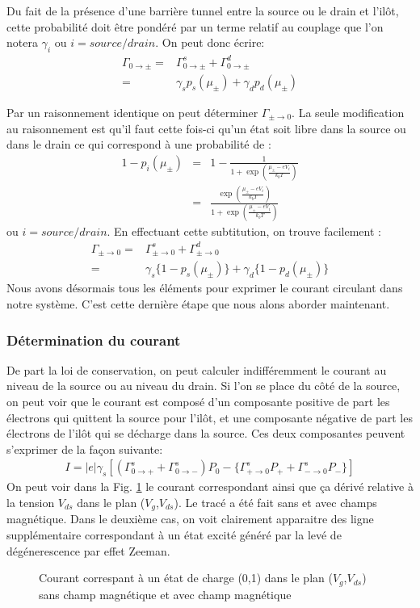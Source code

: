 Du fait de la présence d'une barrière tunnel entre la source ou le drain et l'ilôt, cette probabilité doit être pondéré par un terme relatif au couplage que l'on notera $\gamma_i$ ou $i=source/drain$.
On peut donc écrire:
\begin{eqnarray}
\Gamma_{0 \rightarrow \pm} =& \Gamma_{0 \rightarrow \pm}^s + \Gamma_{0 \rightarrow \pm}^d  \nonumber \\
 =& \gamma_s p_s(\mu_\pm) + \gamma_d p_d(\mu_\pm)
\end{eqnarray}

Par un raisonnement identique on peut déterminer $\Gamma_{\pm \rightarrow 0}$. La seule modification au raisonnement est qu'il faut cette fois-ci qu'un état soit libre dans la source ou dans le drain ce qui correspond à une probabilité de :
\begin{eqnarray}
1 - p_i(\mu_\pm) &=& 1 - \frac{1}{1 + \exp{(\frac{\mu_\pm - eV_i}{k_bT})}} \nonumber \\
 &=& \frac{\exp{(\frac{\mu_\pm - eV_i}{k_bT})}}{1 + \exp{(\frac{\mu_\pm - eV_i}{k_bT})}}
\end{eqnarray}
ou $i=source/drain$.
En effectuant cette subtitution, on trouve facilement :
\begin{eqnarray}
\Gamma_{\pm \rightarrow 0} =& \Gamma_{\pm \rightarrow 0}^s + \Gamma_{\pm \rightarrow 0}^d  \nonumber \\
 =& \gamma_s \{1 - p_s(\mu_\pm)\} + \gamma_d \{1-p_d(\mu_\pm)\}
\end{eqnarray}
Nous avons désormais tous les éléments pour exprimer le courant circulant dans notre système. C'est cette dernière étape que nous alons aborder maintenant.
\subsubsection{Détermination du courant}
De part la loi de conservation, on peut calculer indifféremment le courant au niveau de la source ou au niveau du drain. Si l'on se place du c\^oté de la source, on peut voir que le courant est composé d'un composante positive de part les électrons qui quittent la source pour l'il\^ot, et une composante négative  de part les électrons de l'il\^ot qui se décharge dans la source. Ces deux composantes peuvent s'exprimer de la façon suivante:
\begin{eqnarray}
I = |e| \gamma_s [(\Gamma_{0 \rightarrow +}^s + \Gamma_{0 \rightarrow -}^s) P_0 - \{ \Gamma_{+ \rightarrow 0}^s P_{+} + \Gamma_{- \rightarrow 0}^s P_{-}  \}]
\end{eqnarray}
On peut voir dans la Fig. \ref{SimulatedCoulombMap} le courant correspondant ainsi que ça dérivé relative à la tension $V_{ds}$ dans le plan ($V_g$,$V_{ds}$). Le tracé a été fait sans et avec champs magnétique. Dans le deuxième cas, on voit clairement apparaitre des ligne supplémentaire correspondant à un état excité généré par la levé de dégénerescence par effet Zeeman.
\begin{figure}
\caption{Courant correspant à un état de charge (0,1) dans le plan ($V_g$,$V_{ds}$) sans champ magnétique et avec champ magnétique}
\label{SimulatedCoulombMap}
\end{figure}



